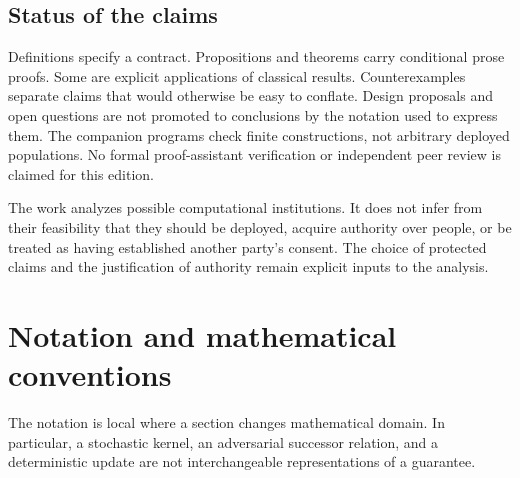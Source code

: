 \documentclass[11pt,letterpaper]{article}
\theoremstyle{plain}
\theoremstyle{definition}
\theoremstyle{remark}
\begin{document}
\subsection*{Status of the claims}

Definitions specify a contract. Propositions and theorems carry conditional prose proofs. Some are explicit applications of classical results. Counterexamples separate claims that would otherwise be easy to conflate. Design proposals and open questions are not promoted to conclusions by the notation used to express them. The companion programs check finite constructions, not arbitrary deployed populations. No formal proof-assistant verification or independent peer review is claimed for this edition.

The work analyzes possible computational institutions. It does not infer from their feasibility that they should be deployed, acquire authority over people, or be treated as having established another party's consent. The choice of protected claims and the justification of authority remain explicit inputs to the analysis.
\clearpage
\section*{Notation and mathematical conventions}

The notation is local where a section changes mathematical domain. In particular, a stochastic kernel, an adversarial successor relation, and a deterministic update are not interchangeable representations of a guarantee.
\end{document}

